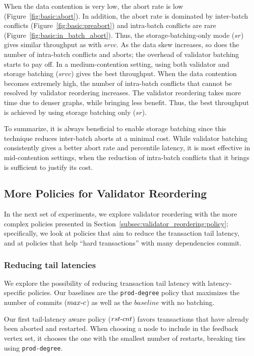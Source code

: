 When the data contention is very low, the abort rate is low (Figure~\ref{fig:basic:abort}). In addition, the abort rate is dominated by inter-batch conflicts (Figure~\ref{fig:basic:preabort}) and intra-batch conflicts are rare (Figure~\ref{fig:basic:in_batch_abort}). Thus, the storage-batching-only mode ($sr$) gives similar throughput as with $srvc$.  As the data skew increases, so does the number of intra-batch conflicts and aborts; the overhead of validator batching starts to pay off. In a medium-contention setting, using both validator and storage batching ($srvc$) gives the best throughput. When the data contention becomes extremely high, the number of intra-batch conflicts that cannot be resolved by validator reordering increases. The validator reordering takes more time due to denser graphs, while bringing less benefit. Thus, the best throughput is achieved by using storage batching only ($sr$). 

To summarize, it is always beneficial to enable storage batching since this technique reduces inter-batch aborts at a minimal cost. While validator batching consistently gives a better abort rate and percentile latency, it is most effective in mid-contention settings, when the reduction of intra-batch conflicts that it brings is sufficient to justify its cost. 

\subsection{More Policies for Validator Reordering}

In the next set of experiments, we explore validator reordering with the more complex policies presented in Section~\ref{subsec:validator_reordering:policy}; specifically, we look at policies that aim to reduce the transaction tail latency, and at policies that help ``hard transactions'' with many dependencies commit.


\subsubsection{Reducing tail latencies}

We explore the possibility of reducing transaction tail latency with latency-specific policies. Our baselines are the \texttt{prod-degree} policy that maximizes the number of commits ($max\hbox{-}c$) as well as the $baseline$ with no batching. 

Our first tail-latency aware policy ($rst\hbox{-}cnt$) favors transactions that have already been aborted and restarted. When choosing a node to include in the feedback vertex set, it chooses the one with the smallest number of restarts, breaking ties using \texttt{prod-degree}.

